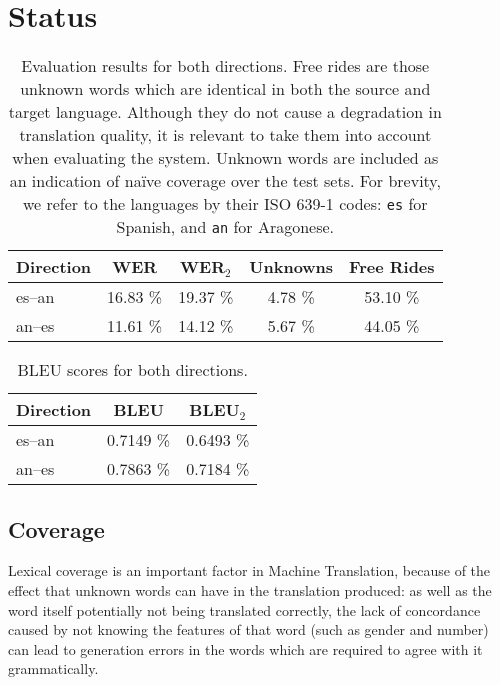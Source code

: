 \documentclass[10pt,a4paper,twocolumn]{article}
\begin{document}
  \section{Status}
  
  \begin{table*}
  \centering
  \begin{tabular}{|l|c|c|c|c|}
  \hline
  Direction    & WER & WER$_2$ & Unknowns & Free Rides\\
  \hline
  es--an        & 16.83 \% & 19.37 \%  & 4.78 \% & 53.10 \% \\
  an--es        & 11.61 \% & 14.12 \%  & 5.67 \% & 44.05 \% \\
  \hline
  \end{tabular}
    \caption{Evaluation results for both directions. Free rides are those unknown words which
       are identical in both the source and target language. Although they do not cause
       a degradation in translation quality, it is relevant to take them into account when
       evaluating the system. Unknown words are included as an indication of naïve coverage
       over the test sets.
       For brevity, we refer to the languages by their ISO 639-1 codes: {\tt es} for Spanish, and {\tt an} for Aragonese.}
    \label{table:quanteval}
  \end{table*}
  
  \begin{table*}
  \centering
  \begin{tabular}{|l|c|c|}
  \hline
  Direction    & BLEU & BLEU$_2$ \\
  \hline
  es--an        & 0.7149 \% & 0.6493 \% \\
  an--es        & 0.7863 \% & 0.7184 \% \\
  \hline
  \end{tabular}
    \caption{BLEU scores for both directions.}
    \label{table:bleu}
  \end{table*}

  \subsection{Coverage}
  
  Lexical coverage is an important factor in Machine Translation, because of the effect that unknown words can have in the translation produced: as well as the word itself potentially not being translated correctly, the lack of concordance caused by not knowing the features of that word (such as gender and number) can lead to generation errors in the words which are required to agree with it grammatically.
  
\end{document}
